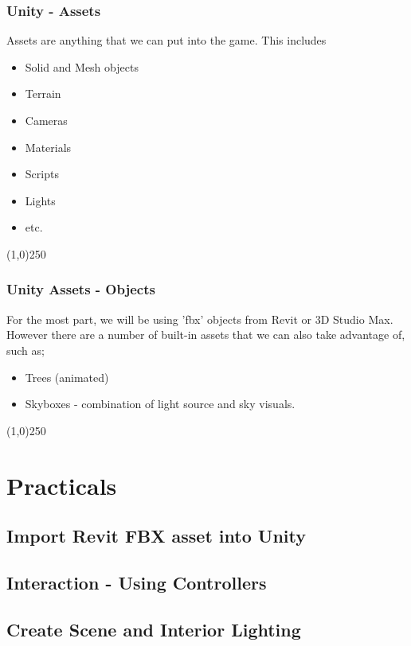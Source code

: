 \begin{frame}
\frametitle{Unity - Assets}
Assets are anything that we can put into the game.  This includes
\begin{itemize}
	\item Solid and Mesh objects
	\item Terrain
	\item Cameras
	\item Materials
	\item Scripts
	\item Lights 
	\item etc.
\end{itemize}
\end{frame}
\begin{center}\line(1,0){250}\end{center}






\begin{frame}
\frametitle{Unity Assets - Objects}
For the most part, we will be using 'fbx' objects from Revit or 3D Studio Max.  However there are a number of built-in assets that we can also take advantage of, such as;
\begin{itemize}
	\item Trees (animated)
	\item Skyboxes - combination of light source and sky visuals.
\end{itemize}
\end{frame}
\begin{center}\line(1,0){250}\end{center}


\section{Practicals}


\subsection{Import Revit FBX asset into Unity}



\subsection{Interaction - Using Controllers}


\subsection{Create Scene and Interior Lighting}


